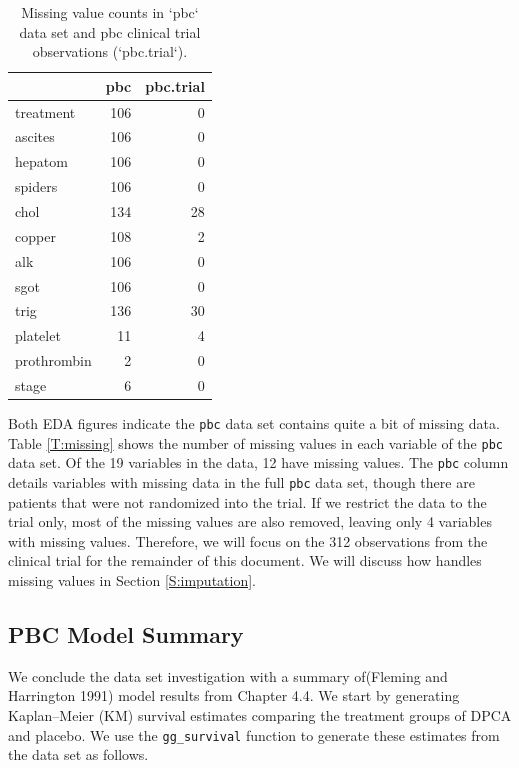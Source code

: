 \documentclass[article]{jss}
\begin{document}
\begin{table}

\caption{Missing value counts in `pbc` data set and pbc clinical trial observations (`pbc.trial`).}
\centering
\begin{tabular}[t]{l|r|r}
\hline
  & pbc & pbc.trial\\
\hline
treatment & 106 & 0\\
\hline
ascites & 106 & 0\\
\hline
hepatom & 106 & 0\\
\hline
spiders & 106 & 0\\
\hline
chol & 134 & 28\\
\hline
copper & 108 & 2\\
\hline
alk & 106 & 0\\
\hline
sgot & 106 & 0\\
\hline
trig & 136 & 30\\
\hline
platelet & 11 & 4\\
\hline
prothrombin & 2 & 0\\
\hline
stage & 6 & 0\\
\hline
\end{tabular}
\end{table}

Both EDA figures indicate the \texttt{pbc} data set contains quite a bit
of missing data. Table \ref{T:missing} shows the number of missing
values in each variable of the \texttt{pbc} data set. Of the 19
variables in the data, 12 have missing values. The \texttt{pbc} column
details variables with missing data in the full \texttt{pbc} data set,
though there are patients that were not randomized into the trial. If we
restrict the data to the trial only, most of the missing values are also
removed, leaving only 4 variables with missing values. Therefore, we
will focus on the 312 observations from the clinical trial for the
remainder of this document. We will discuss how 
handles missing values in Section \ref{S:imputation}.

\subsection{PBC Model Summary}\label{pbc-model-summary}

We conclude the data set investigation with a summary of(Fleming and
Harrington 1991) model results from Chapter 4.4. We start by generating
Kaplan--Meier (KM) survival estimates comparing the treatment groups of
DPCA and placebo. We use the  \texttt{gg\_survival}
function to generate these estimates from the data set as follows.
\end{document}
